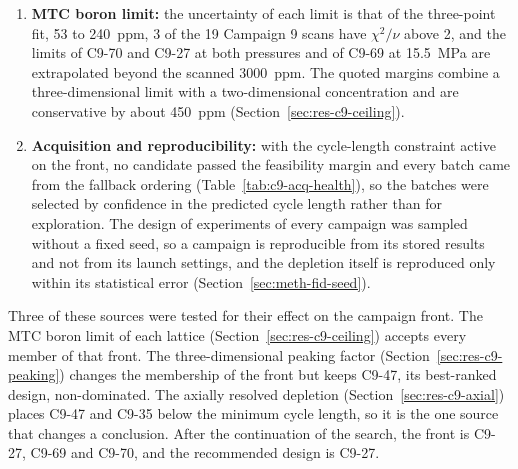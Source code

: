 \begin{enumerate}
  \item \textbf{MTC boron limit:} the uncertainty of each limit is that
        of the three-point fit, 53 to \SI{240}{ppm}, 3 of the
        19 Campaign 9 scans have $\chi^2/\nu$ above 2, and the
        limits of C9-70 and C9-27 at both pressures and of C9-69 at
        \SI{15.5}{MPa} are extrapolated beyond the scanned
        \SI{3000}{ppm}. The quoted margins combine a three-dimensional
        limit with a two-dimensional concentration and are conservative
        by about \SI{450}{ppm} (Section~\ref{sec:res-c9-ceiling}).

  \item \textbf{Acquisition and reproducibility:} with the cycle-length
        constraint active on the front, no candidate passed the
        feasibility margin and every batch came from the fallback
        ordering (Table~\ref{tab:c9-acq-health}), so the batches were
        selected by confidence in the predicted cycle length rather than
        for exploration. The design of experiments of every campaign
        was sampled without a fixed seed, so a campaign is reproducible
        from its stored results and not from its launch settings, and
        the depletion itself is reproduced only within its statistical
        error (Section~\ref{sec:meth-fid-seed}).
\end{enumerate}

Three of these sources were tested for their effect on the campaign
front. The MTC boron limit of each lattice
(Section~\ref{sec:res-c9-ceiling}) accepts every member of that front.
The three-dimensional peaking factor (Section~\ref{sec:res-c9-peaking})
changes the membership of the front but keeps C9-47, its best-ranked
design, non-dominated. The axially resolved depletion
(Section~\ref{sec:res-c9-axial}) places C9-47 and C9-35 below the
minimum cycle length, so it is the one source that changes a
conclusion. After the continuation of the search, the front is C9-27,
C9-69 and C9-70, and the recommended design is C9-27.

\setcounter{secnumdepth}{2}
